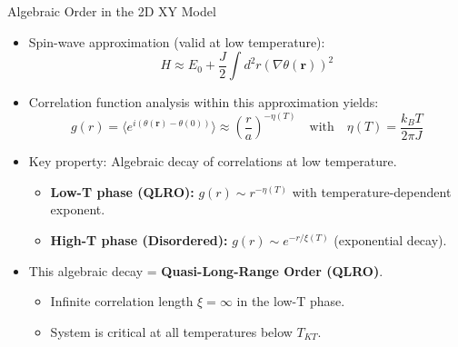 \documentclass[11pt,aspectratio=169]{beamer}
\newcommand\mathalert[1]{{\color{accentcolor}#1}}
\begin{document}
\begin{frame}{Algebraic Order in the 2D XY Model}
    \begin{itemize}
        \item Spin-wave approximation (valid at low temperature):
        \begin{equation*}
            H \approx E_0 + \frac{J}{2} \int d^2r (\nabla \theta(\mathbf{r}))^2
        \end{equation*}
        \pause
        \item Correlation function analysis within this approximation yields:
        \begin{equation*}
            g(r) = \langle e^{i(\theta(\mathbf{r}) - \theta(0))} \rangle \approx \left( \frac{r}{a} \right)^{-\eta(T)} \quad \text{with} \quad \eta(T) = \frac{k_B T}{2\pi J}
        \end{equation*}
        \item Key property: \mathalert{Algebraic decay} of correlations at low temperature.
        \begin{itemize}
            \item \textbf{Low-T phase (QLRO):} $g(r) \sim r^{-\eta(T)}$ with temperature-dependent exponent.
            \item \textbf{High-T phase (Disordered):} $g(r) \sim e^{-r/\xi(T)}$ (exponential decay).
        \end{itemize}
        \pause
        \item This algebraic decay = \textbf{Quasi-Long-Range Order (QLRO)}.
        \begin{itemize}
            \item Infinite correlation length $\xi = \infty$ in the low-T phase.
            \item System is critical at all temperatures below $T_{KT}$.
        \end{itemize}
    \end{itemize}
\end{frame}
\end{document}
